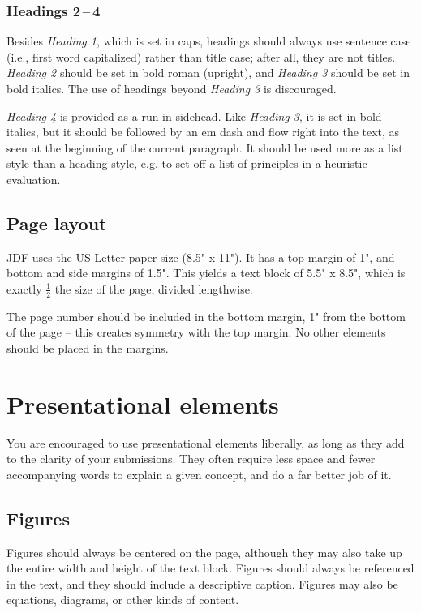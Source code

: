 \documentclass[
	letterpaper, %
]{jdf}
\begin{document}
\subsubsection{Headings 2\,–\,4}
Besides \emph{Heading 1}, which is set in caps, headings should always use sentence case (i.e., first word capitalized) rather than title case; after all, they are not titles. \emph{Heading 2} should be set in bold roman (upright), and \emph{Heading 3} should be set in bold italics. The use of headings beyond \emph{Heading 3} is discouraged.

\emph{Heading 4} is provided as a run-in sidehead. Like \emph{Heading 3}, it is set in bold italics, but it should be followed by an em dash and flow right into the text, as seen at the beginning of the current paragraph. It should be used more as a list style than a heading style, e.g. to set off a list of principles in a heuristic evaluation.

\subsection{Page layout}
JDF uses the US Letter paper size (8.5" x 11"). It has a top margin of 1", and bottom and side margins of 1.5". This yields a text block of 5.5" x 8.5", which is exactly \(\frac{1}{2}\) the size of the page, divided lengthwise.

The page number should be included in the bottom margin, 1" from the bottom of the page – this creates symmetry with the top margin. No other elements should be placed in the margins.

\section{Presentational elements}
You are encouraged to use presentational elements liberally, as long as they add to the clarity of your submissions. They often require less space and fewer accompanying words to explain a given concept, and do a far better job of it.

\subsection{Figures}
Figures should always be centered on the page, although they may also take up the entire width and height of the text block. Figures should always be referenced in the text, and they should include a descriptive caption. Figures may also be equations, diagrams, or other kinds of content.
\end{document}
